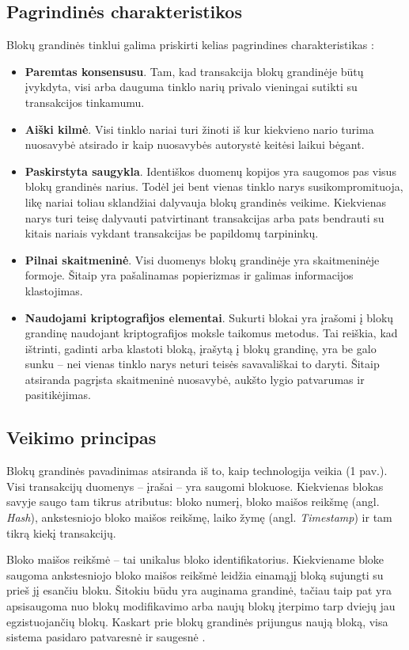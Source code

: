 \documentclass{VUMIFPSkursinis}
\begin{document}
\subsection{Pagrindinės charakteristikos}
Blokų grandinės tinklui galima priskirti kelias pagrindines charakteristikas \cite{deloite2017}:
\begin{itemize}
    \item \textbf{Paremtas konsensusu}. Tam, kad transakcija blokų grandinėje būtų įvykdyta, visi arba dauguma tinklo narių privalo vieningai sutikti su transakcijos tinkamumu.
    \item \textbf{Aiški kilmė}. Visi tinklo nariai turi žinoti iš kur kiekvieno nario turima nuosavybė atsirado ir kaip nuosavybės autorystė keitėsi laikui bėgant.
    \item \textbf{Paskirstyta saugykla}. Identiškos duomenų kopijos yra saugomos pas visus blokų grandinės narius. Todėl jei bent vienas tinklo narys susikompromituoja, likę nariai toliau sklandžiai dalyvauja blokų grandinės veikime. Kiekvienas narys turi teisę dalyvauti patvirtinant transakcijas arba pats bendrauti su kitais nariais vykdant transakcijas be papildomų tarpininkų.
    \item \textbf{Pilnai skaitmeninė}. Visi duomenys blokų grandinėje yra skaitmeninėje formoje. Šitaip yra pašalinamas popierizmas ir galimas informacijos klastojimas.
    \item \textbf{Naudojami kriptografijos elementai}. Sukurti blokai yra įrašomi į blokų grandinę naudojant kriptografijos moksle taikomus metodus. Tai reiškia, kad ištrinti, gadinti arba klastoti bloką, įrašytą į blokų grandinę, yra be galo sunku – nei vienas tinklo narys neturi teisės savavališkai to daryti. Šitaip atsiranda pagrįsta skaitmeninė nuosavybė, aukšto lygio patvarumas ir pasitikėjimas. 
\end{itemize}

\subsection{Veikimo principas}
Blokų grandinės pavadinimas atsiranda iš to, kaip technologija veikia (1 pav.). Visi transakcijų duomenys – įrašai – yra saugomi blokuose. Kiekvienas blokas savyje saugo tam tikrus atributus: bloko numerį, bloko maišos reikšmę (angl. \textit{Hash}), ankstesniojo bloko maišos reikšmę, laiko žymę (angl. \textit{Timestamp}) ir tam tikrą kiekį transakcijų. 

Bloko maišos reikšmė – tai unikalus bloko identifikatorius. Kiekviename bloke saugoma ankstesniojo bloko maišos reikšmė leidžia einamąjį bloką sujungti su prieš jį esančiu bloku. Šitokiu būdu yra auginama grandinė, tačiau taip pat yra apsisaugoma nuo blokų modifikavimo arba naujų blokų įterpimo tarp dviejų jau egzistuojančių blokų. Kaskart prie blokų grandinės prijungus naują bloką, visa sistema pasidaro patvaresnė ir saugesnė \cite{chiu2017economics}.
\end{document}
